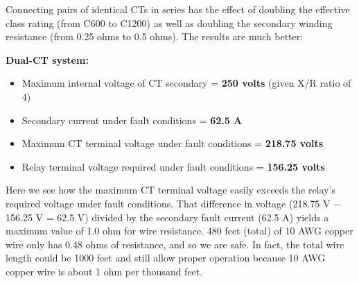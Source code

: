 Connecting pairs of identical CTs in series has the effect of doubling the effective class rating (from C600 to C1200) as well as doubling the secondary winding resistance (from 0.25 ohms to 0.5 ohms).  The results are much better:

\vskip 10pt

\noindent
{\bf Dual-CT system:}

\begin{itemize}
\item{} Maximum internal voltage of CT secondary = {\bf 250 volts} (given X/R ratio of 4)
\item{} Secondary current under fault conditions = {\bf 62.5 A}
\item{} Maximum CT terminal voltage under fault conditions = {\bf 218.75 volts}
\item{} Relay terminal voltage required under fault conditions = {\bf 156.25 volts}
\end{itemize}

Here we see how the maximum CT terminal voltage easily exceeds the relay's required voltage under fault conditions.  That difference in voltage (218.75 V $-$ 156.25 V = 62.5 V) divided by the secondary fault current (62.5 A) yields a maximum value of 1.0 ohm for wire resistance.  480 feet (total) of 10 AWG copper wire only has 0.48 ohms of resistance, and so we are safe.  In fact, the total wire length could be 1000 feet and still allow proper operation because 10 AWG copper wire is about 1 ohm per thousand feet.




